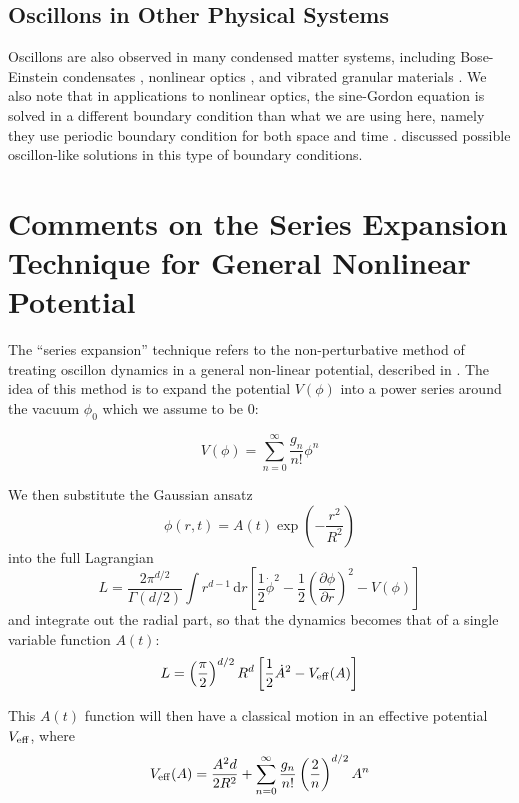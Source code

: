 \documentclass{report}
\begin{document}
\section{Oscillons in Other Physical Systems}
Oscillons are also observed in many condensed matter systems, including Bose-Einstein condensates \cite{umbanhowar1996localized}, nonlinear optics \cite{Copeland:2014qra}, and vibrated granular materials \cite{Tsimring:1997zz}. We also note that in applications to nonlinear optics, the sine-Gordon equation is solved in a different boundary condition than what we are using here, namely they use periodic boundary condition for both space and time \cite{JAWORSKI1982427, 0305-4470-15-10-015}. \cite{JAWORSKI1982427, 0305-4470-15-10-015} discussed possible oscillon-like solutions in this type of boundary conditions.

\chapter{Comments on the Series Expansion Technique for General Nonlinear Potential}
The ``series expansion'' technique refers to the non-perturbative method of treating oscillon dynamics in a general non-linear potential, described in \cite{PhysRevD.80.125037, Gleiser:2008ty}. The idea of this method is to expand the potential $V(\phi)$ into a power series around the vacuum $\phi_0$ which we assume to be $0$:

\begin{equation}
  V(\phi)=\sum_{n=0}^\infty \frac{g_n}{n!}\phi^n
\end{equation}

We then substitute the Gaussian ansatz
\begin{equation}
  \phi(r,t) = A(t) \exp\left(-\frac{r^2}{R^2}\right)
\end{equation}
into the full Lagrangian
\begin{equation}\label{lagfull}
    L = \frac{2\pi^{d/2}}{\Gamma(d/2)}\int r^{d-1}\,\mathrm{d}r\left[\frac{1}{2}\dot{\phi}^2 -
      \frac{1}{2}\left(\frac{\partial\phi}{\partial r}\right)^2-V(\phi)\right]
\end{equation}
and integrate out the radial part, so that the dynamics becomes that of a single variable function $A(t)$:
\begin{equation}
  L= \left(\frac{\pi}{2}\right)^{d/2}R^d\left[\frac{1}{2}\dot{A}^2 - V_{\rm eff}(A)\right]
\end{equation}

This $A(t)$ function will then have a classical motion in an effective potential $V_{\rm eff}$, where
\begin{equation}\label{effpot}
  V_{\rm eff}(A) = \frac{A^2d}{2R^2} +
  \sum_{n=0}^\infty \frac{g_n}{n!}\left(\frac{2}{n}\right)^{d/2} A^n
\end{equation}
\end{document}

